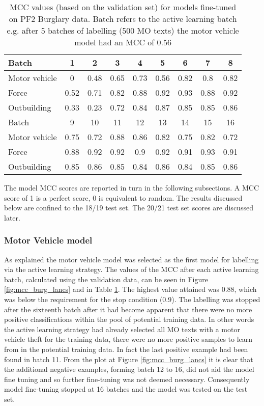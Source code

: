 \begin{table}[]
\centering
\begin{tabular}{@{}lcccccccc@{}}
\toprule
Batch       & 1    & 2    & 3    & 4    & 5    & 6    & 7    & 8    \\ \midrule
Motor vehicle          & 0    & 0.48 & 0.65 & 0.73 & 0.56 & 0.82 & 0.8  & 0.82 \\
Force       & 0.52 & 0.71 & 0.82 & 0.88 & 0.92 & 0.93 & 0.88 & 0.92 \\
Outbuilding & 0.33 & 0.23 & 0.72 & 0.84 & 0.87 & 0.85 & 0.85 & 0.86 \\\midrule
Batch       & 9    & 10   & 11   & 12   & 13   & 14   & 15   & 16   \\\midrule
Motor vehicle         & 0.75 & 0.72 & 0.88 & 0.86 & 0.82 & 0.75 & 0.82 & 0.72 \\
Force       & 0.88 & 0.92 & 0.92 & 0.9  & 0.92 & 0.91 & 0.93 & 0.91 \\
Outbuilding & 0.85 & 0.86 & 0.85 & 0.84 & 0.86 & 0.84 & 0.85 & 0.86 \\ \bottomrule
\end{tabular}
\caption[Batch metrics - PF2 data. All models]{\label{tab:results_1c}MCC values (based on the validation set) for models fine-tuned on PF2 Burglary data. Batch refers to the active learning batch e.g. after 5 batches of labelling (500 MO texts) the motor vehicle model had an MCC of 0.56 }
\end{table}


 The model MCC scores are reported in turn in the following subsections. A MCC score of 1 is a perfect score, 0 is equivalent to random. The results discussed below are confined to the 18/19 test set. The 20/21 test set scores are discussed later.  

\subsubsection{Motor Vehicle model} As explained the motor vehicle model was selected as the first model for labelling via the active learning strategy. The values of the MCC after each active learning batch, calculated using the validation data, can be seen in Figure \ref{fig:mcc_burg_lancs} and in Table \ref{tab:results_1c}. The highest value attained was 0.88, which was below the requirement for the stop condition (0.9). The labelling was stopped after the sixteenth batch after it had become apparent that there were no more positive classifications within the pool of potential training data. In other words the active learning strategy had already selected all MO texts with a motor vehicle theft for the training data, there were no more positive samples to learn from in the potential training data. In fact the last positive example had been found in batch 11. From the plot at Figure \ref{fig:mcc_burg_lancs} it is clear that the additional negative examples, forming batch 12 to 16, did not aid the model fine tuning and so further fine-tuning was not deemed necessary. Consequently model fine-tuning stopped at 16 batches and the model was tested on the test set.


